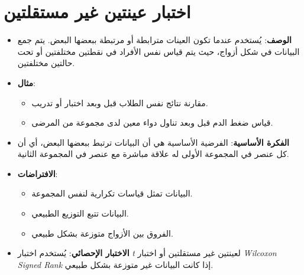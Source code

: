 	\section{اختبار عينتين غير مستقلتين }
	\begin{itemize}
		\item \textbf{الوصف}: يُستخدم عندما تكون العينات مترابطة أو مرتبطة ببعضها البعض. يتم جمع البيانات في شكل أزواج، حيث يتم قياس نفس الأفراد في نقطتين مختلفتين أو تحت حالتين مختلفتين.
		\item \textbf{مثال}:
		\begin{itemize}
			\item مقارنة نتائج نفس الطلاب قبل وبعد اختبار أو تدريب.
			\item قياس ضغط الدم قبل وبعد تناول دواء معين لدى مجموعة من المرضى.
		\end{itemize}
		\item \textbf{الفكرة الأساسية}: الفرضية الأساسية هي أن البيانات ترتبط ببعضها البعض، أي أن كل عنصر في المجموعة الأولى له علاقة مباشرة مع عنصر في المجموعة الثانية.
		\item \textbf{الافتراضات}:
		\begin{itemize}
			\item البيانات تمثل قياسات تكرارية لنفس المجموعة.
			\item البيانات تتبع التوزيع الطبيعي.
			\item الفروق بين الأزواج متوزعة بشكل طبيعي.
		\end{itemize}
		\item \textbf{الاختبار الإحصائي}: يُستخدم اختبار \textit{t} لعينتين غير مستقلتين أو اختبار \textit{Wilcoxon Signed Rank} إذا كانت البيانات غير متوزعة بشكل طبيعي.
	\end{itemize}
	

